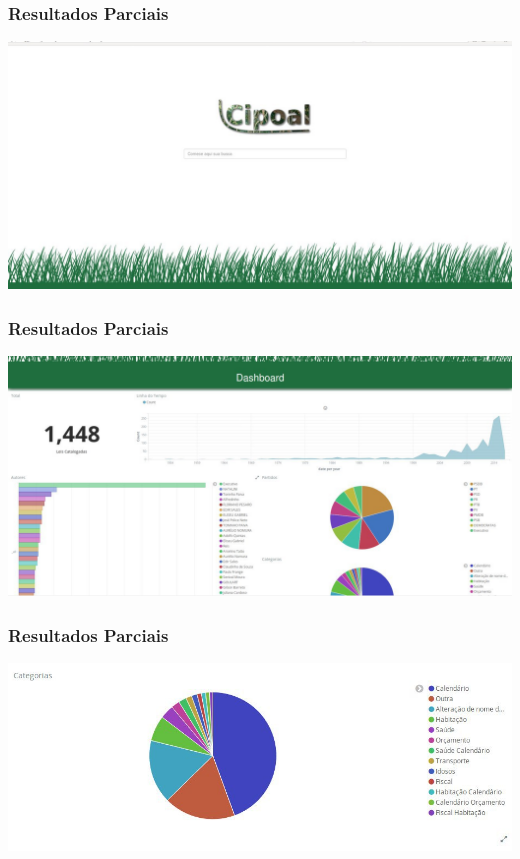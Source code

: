 \documentclass[11pt]{beamer}
\begin{document}
\begin{frame}
\frametitle{Resultados Parciais}
\includegraphics[width=\columnwidth,height=\textheight,keepaspectratio]{Cipoal1.jpg}
\end{frame}
\begin{frame}
\frametitle{Resultados Parciais}
\includegraphics[width=\columnwidth,height=\textheight,keepaspectratio]{Cipoal2.jpg}

\end{frame}
\begin{frame}
\frametitle{Resultados Parciais}
\includegraphics[width=\columnwidth,height=\textheight,keepaspectratio]{CipoalCat.jpg}

\end{frame}
\end{document}

